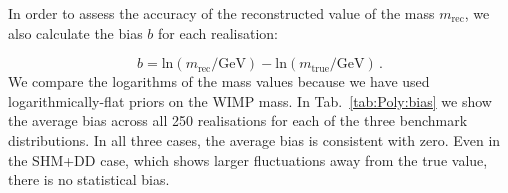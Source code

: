 

In order to assess the accuracy of the reconstructed value of the mass $m_\textrm{rec}$, we also calculate the bias $b$ for each realisation:

\begin{equation}
\label{eq:Poly:bias}
b = \textrm{ln}(m_\textrm{rec} / \textrm{GeV}) - \textrm{ln}(m_\textrm{true} / \textrm{GeV})\,.
\end{equation}
We compare the logarithms of the mass values because we have used logarithmically-flat priors on the WIMP mass. In Tab.~\ref{tab:Poly:bias} we show the average bias across all 250 realisations for each of the three benchmark distributions. In all three cases, the average bias is consistent with zero. Even in the SHM+DD case, which shows larger fluctuations away from the true value, there is no statistical bias.



